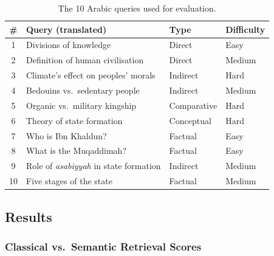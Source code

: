 \documentclass[12pt, a4paper]{article}
\renewcommand{\arraystretch}{1.12}
\begin{document}
\begin{table}[H]
\centering
\renewcommand{\arraystretch}{1.3}
\begin{tabular}{c l l l}
\toprule
\textbf{\#} & \textbf{Query (translated)} & \textbf{Type} & \textbf{Difficulty} \\
\midrule
1  & Divisions of knowledge              & Direct      & Easy   \\
2  & Definition of human civilisation    & Direct      & Medium \\
3  & Climate's effect on peoples' morals & Indirect    & Hard   \\
4  & Bedouins vs.\ sedentary people      & Indirect    & Medium \\
5  & Organic vs.\ military kingship      & Comparative & Hard   \\
6  & Theory of state formation           & Conceptual  & Hard   \\
7  & Who is Ibn Khaldun?                 & Factual     & Easy   \\
8  & What is the Muqaddimah?             & Factual     & Easy   \\
9  & Role of \emph{asabiyyah} in state formation & Indirect & Medium \\
10 & Five stages of the state            & Factual     & Medium \\
\bottomrule
\end{tabular}
\caption{The 10 Arabic queries used for evaluation.}
\label{tab:p4_queries}
\end{table}

\subsection{Results}

\subsubsection{Classical vs.\ Semantic Retrieval Scores}
\end{document}
